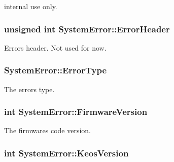internal use only. 

\subsubsection[{\texorpdfstring{Error\+Header}{ErrorHeader}}]{\setlength{\rightskip}{0pt plus 5cm}unsigned int System\+Error\+::\+Error\+Header}\hypertarget{struct_system_error_ab854e1de73db72c8e2fe47a91d58037d}{}\label{struct_system_error_ab854e1de73db72c8e2fe47a91d58037d}


Error\textquotesingle{}s header. Not used for now. 

\subsubsection[{\texorpdfstring{Error\+Type}{ErrorType}}]{ System\+Error\+::\+Error\+Type}\hypertarget{struct_system_error_a8afdc5f30a9b376b95191c057e37cb7c}{}\label{struct_system_error_a8afdc5f30a9b376b95191c057e37cb7c}


The error\textquotesingle{}s type. 

\subsubsection[{\texorpdfstring{Firmware\+Version}{FirmwareVersion}}]{\setlength{\rightskip}{0pt plus 5cm}int System\+Error\+::\+Firmware\+Version}\hypertarget{struct_system_error_ab58ef88af94b436bbfa4513df71d9f9c}{}\label{struct_system_error_ab58ef88af94b436bbfa4513df71d9f9c}


The firmware\textquotesingle{}s code version. 

\subsubsection[{\texorpdfstring{Keos\+Version}{KeosVersion}}]{\setlength{\rightskip}{0pt plus 5cm}int System\+Error\+::\+Keos\+Version}\hypertarget{struct_system_error_a9e8bbb5be1819da3921241691ba46e23}{}\label{struct_system_error_a9e8bbb5be1819da3921241691ba46e23}


